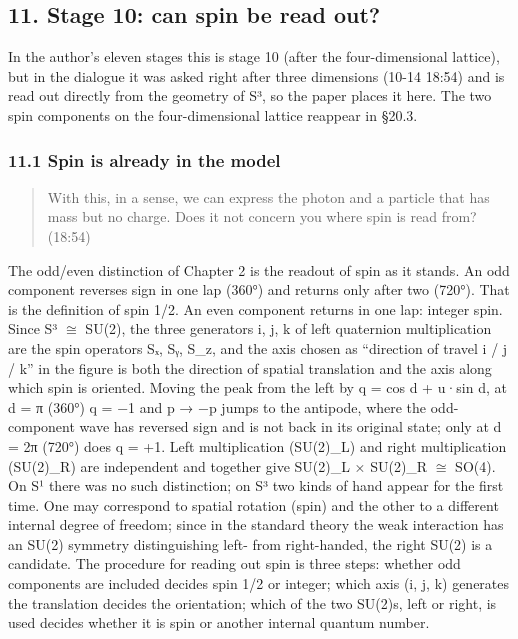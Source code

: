 \documentclass[
  a4paper,
]{article}
\begin{document}
\subsection{11. Stage 10: can spin be read
out?}\label{stage-10-can-spin-be-read-out}

In the author's eleven stages this is stage 10 (after the
four-dimensional lattice), but in the dialogue it was asked right after
three dimensions (10-14 18:54) and is read out directly from the
geometry of S³, so the paper places it here. The two spin components on
the four-dimensional lattice reappear in §20.3.

\subsubsection{11.1 Spin is already in the
model}\label{spin-is-already-in-the-model}

\begin{quote}
With this, in a sense, we can express the photon and a particle that has
mass but no charge. Does it not concern you where spin is read from?
(18:54)
\end{quote}

The odd/even distinction of Chapter 2 is the readout of spin as it
stands. An odd component reverses sign in one lap (360°) and returns
only after two (720°). That is the definition of spin 1/2. An even
component returns in one lap: integer spin. Since S³ \(\cong\) SU(2),
the three generators i, j, k of left quaternion multiplication are the
spin operators Sₓ, Sᵧ, S\_z, and the axis chosen as ``direction of
travel i / j / k'' in the figure is both the direction of spatial
translation and the axis along which spin is oriented. Moving the peak
from the left by q = cos d + u·sin d, at d = π (360°) q = −1 and p → −p
jumps to the antipode, where the odd-component wave has reversed sign
and is not back in its original state; only at d = 2π (720°) does q =
+1. Left multiplication (SU(2)\_L) and right multiplication (SU(2)\_R)
are independent and together give SU(2)\_L × SU(2)\_R \(\cong\) SO(4).
On S¹ there was no such distinction; on S³ two kinds of hand appear for
the first time. One may correspond to spatial rotation (spin) and the
other to a different internal degree of freedom; since in the standard
theory the weak interaction has an SU(2) symmetry distinguishing left-
from right-handed, the right SU(2) is a candidate. The procedure for
reading out spin is three steps: whether odd components are included
decides spin 1/2 or integer; which axis (i, j, k) generates the
translation decides the orientation; which of the two SU(2)s, left or
right, is used decides whether it is spin or another internal quantum
number.
\end{document}

